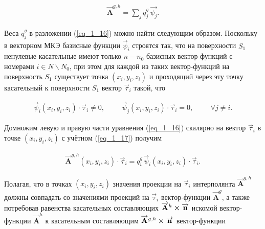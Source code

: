 \begin{equation} \label{eq_1_16}
	\begin{gathered}
		\overrightarrow{\textbf{A}}^{g,h} = \sum \limits_j q_j^g \, \overrightarrow{\psi_j}.
	\end{gathered}
\end{equation}

Веса $q_j^g$ в разложении (\ref{eq_1_16}) можно найти следующим образом. Поскольку в векторном МКЭ базисные функции $\overrightarrow{\psi}_i$ строятся так, что на поверхности $S_1$ ненулевые касательные имеют только $n-n_0$ базисных вектор-функций с номерами $i \in N \backslash N_0$, при этом для каждой из таких вектор-функций на поверхность $S_1$ существует точка $\left(x_i, y_i, z_i\right)$ и проходящий через эту точку касательный к поверхности $S_1$ вектор $\overrightarrow{\tau}_i$ такой, что

\begin{equation} \label{eq_1_17}
	\begin{gathered}
		\overrightarrow{\psi}_i \left(x_i, y_i, z_i\right) \cdot \overrightarrow{\tau}_i \neq 0, \hspace{1cm} \overrightarrow{\psi}_j \left(x_i, y_i, z_i\right) \cdot \overrightarrow{\tau}_i = 0, \hspace{1cm} \forall j \neq i.
	\end{gathered}
\end{equation}

Домножим левую и правую части уравнения (\ref{eq_1_16}) скалярно на вектор $\overrightarrow{\tau}_i$ в точке $\left(x_i, y_i, z_i\right)$ с учётном (\ref{eq_1_17}) получим 

\begin{equation*} \label{eq_1_18}
	\begin{gathered}
		\overrightarrow{\textbf{A}}^{g,h} \left(x_i, y_i, z_i\right) \cdot \overrightarrow{\tau}_i = q_i^g \, \overrightarrow{\psi}_i \left(x_i, y_i, z_i\right) \cdot \overrightarrow{\tau}_i.
	\end{gathered}
\end{equation*}

Полагая, что в точках $\left(x_i, y_i, z_i\right)$ значения проекции на $\overrightarrow{\tau}_i$ интерполянта $\overrightarrow{\textbf{A}}^{g,h}$ должны совпадать со значениями проекций на $\overrightarrow{\tau}_i$ вектор-функции $\overrightarrow{\textbf{A}}^g$, а также потребовав равенства касательных составляющих $\overrightarrow{\textbf{A}}^h \cross \overrightarrow{\textbf{n}}$ искомой вектор-функции $\overrightarrow{\textbf{A}}^h$ к касательным составляющим $\overrightarrow{\textbf{A}}^{g,h} \cross \overrightarrow{\textbf{n}}$ вектор-функции

